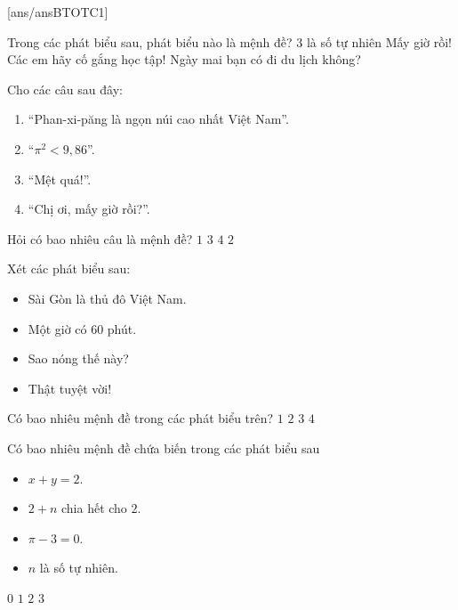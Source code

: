 [ans/ansBTOTC1]
\begin{ex}%
	Trong các phát biểu sau, phát biểu nào là mệnh đề?
	\choice
	{\True $3$ là số tự nhiên}
	{Mấy giờ rồi!}
	{Các em hãy cố gắng học tập!}
	{Ngày mai bạn có đi du lịch không?}
\end{ex}

\begin{ex}%
	Cho các câu sau đây:
	\begin{enumerate}
		\item ``Phan-xi-păng là ngọn núi cao nhất Việt Nam''.
		\item ``$\pi^2<9,86$''.
		\item ``Mệt quá!''.
		\item ``Chị ơi, mấy giờ rồi?''.
	\end{enumerate}
	Hỏi có bao nhiêu câu là mệnh đề?
	\choice
	{$1$}
	{$3$}
	{$4$}
	{\True $2$}
\end{ex}
\begin{ex}%
	Xét các phát biểu sau:
	\begin{itemize}
		\item Sài Gòn là thủ đô Việt Nam.
		\item Một giờ có 60 phút.
		\item Sao nóng thế này?
		\item Thật tuyệt vời!
	\end{itemize}
	Có bao nhiêu mệnh đề trong các phát biểu trên?
	\choice
	{$1$}
	{\True $2$}
	{$3$}
	{$4$}
\end{ex}

\begin{ex}%
	Có bao nhiêu mệnh đề chứa biến trong các phát biểu sau
	\begin{itemize}
		\item $x+y=2$.
		\item $2+n$ chia hết cho $2$.
		\item $\pi -3 =0$.
		\item $n$ là số tự nhiên.
	\end{itemize}
	\choice
	{$0$}
	{$1$}
	{$2$}
	{\True $3$}
\end{ex}


